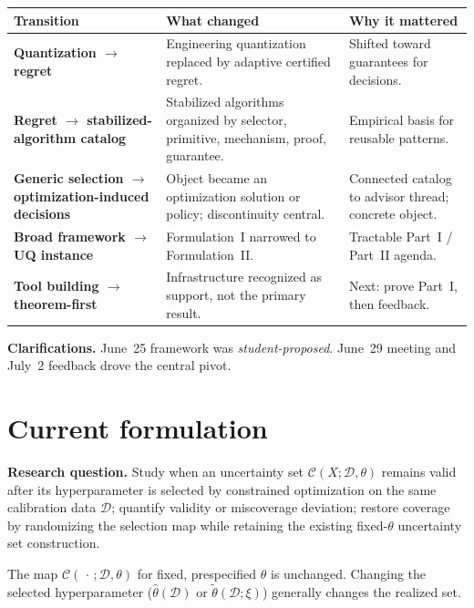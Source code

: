 \documentclass[11pt]{article}
\begin{document}
\renewcommand{\arraystretch}{1.15}
\begin{tabularx}{\textwidth}{>{\RaggedRight\bfseries\color{navy}\arraybackslash}p{}
  >{\RaggedRight\arraybackslash}X
  >{\RaggedRight\arraybackslash}X}
\toprule
Transition & What changed & Why it mattered \\
\midrule
Quantization $\to$ regret &
Engineering quantization replaced by adaptive certified regret. &
Shifted toward guarantees for decisions. \\
\addlinespace
Regret $\to$ stabilized-algorithm catalog &
Stabilized algorithms organized by selector, primitive, mechanism, proof, guarantee. &
Empirical basis for reusable patterns. \\
\addlinespace
Generic selection $\to$ optimization-induced decisions &
Object became an optimization solution or policy; discontinuity central. &
Connected catalog to advisor thread; concrete object. \\
\addlinespace
Broad framework $\to$ UQ instance &
Formulation~I narrowed to Formulation~II. &
Tractable Part~I / Part~II agenda. \\
\addlinespace
Tool building $\to$ theorem-first &
Infrastructure recognized as support, not the primary result. &
Next: prove Part~I, then feedback. \\
\bottomrule
\end{tabularx}

\vspace{4pt}
\noindent\textbf{Clarifications.}
June~25 framework was \emph{student-proposed}. June~29 meeting and July~2 feedback drove
the central pivot.

\section{Current formulation}

\begin{tcolorbox}[basebox]
\textbf{Research question.}
Study when an uncertainty set $\mathcal{C}(X;\mathcal{D},\theta)$ remains valid after its
hyperparameter is selected by constrained optimization on the same calibration data
$\mathcal{D}$; quantify validity or miscoverage deviation; restore coverage by randomizing
the selection map while retaining the existing fixed-$\theta$ uncertainty set construction.

The map $\mathcal{C}(\,\cdot\,;\mathcal{D},\theta)$ for fixed, prespecified $\theta$ is
unchanged. Changing the selected hyperparameter
($\hat\theta(\mathcal{D})$ or $\widetilde\theta(\mathcal{D};\xi)$) generally changes the
realized set.
\end{tcolorbox}
\end{document}
